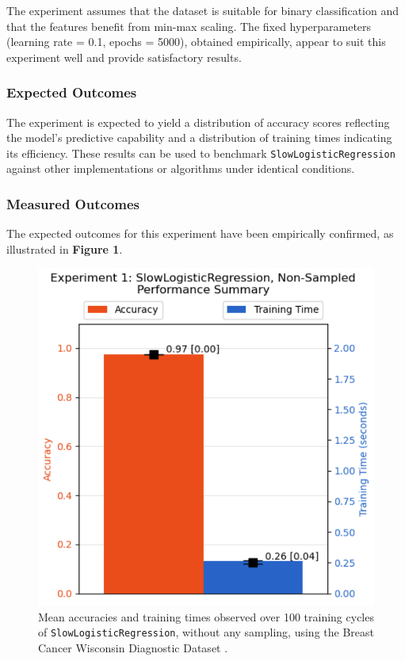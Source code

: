 \documentclass{article}
\theoremstyle{plain}
\theoremstyle{definition}
\theoremstyle{remark}
\begin{document}
The experiment assumes that the dataset is suitable for binary classification and that the features benefit from min-max scaling. The fixed hyperparameters (learning rate = 0.1, epochs = 5000), obtained empirically, appear to suit this experiment well and provide satisfactory results.


\subsubsection{Expected Outcomes}

The experiment is expected to yield a distribution of accuracy scores reflecting the model's predictive capability and a distribution of training times indicating its efficiency. These results can be used to benchmark \texttt{SlowLogisticRegression} against other implementations or algorithms under identical conditions.

\subsubsection{Measured Outcomes}

The expected outcomes for this experiment have been empirically confirmed, as illustrated in \textbf{Figure 1}.

\begin{figure}[ht]
	\vskip 0.2in
	\begin{center}
		\centerline{\includegraphics[width=\columnwidth]{experiment_01}}
		\caption{Mean accuracies and training times observed over 100 training cycles of \texttt{SlowLogisticRegression}, without any sampling, using the Breast Cancer Wisconsin Diagnostic Dataset \cite{breastcancer}.}
		\label{experiment_01}
	\end{center}
	\vskip -0.2in
\end{figure}
\end{document}
